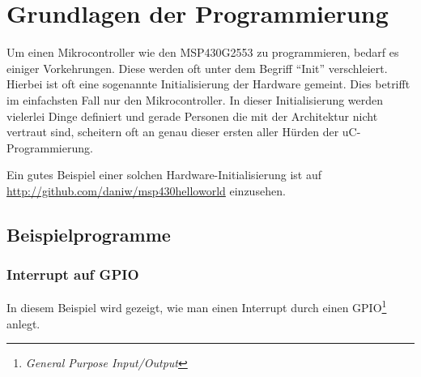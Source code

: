 \section{Grundlagen der Programmierung}
Um einen Mikrocontroller wie den MSP430G2553 zu programmieren, bedarf es
einiger Vorkehrungen. Diese werden oft unter dem Begriff ``Init'' 
verschleiert. Hierbei ist oft eine sogenannte Initialisierung der 
Hardware gemeint. Dies betrifft im einfachsten Fall nur den Mikrocontroller.
In dieser Initialisierung werden vielerlei Dinge definiert und gerade Personen
die mit der Architektur nicht vertraut sind, scheitern oft an genau dieser
ersten aller Hürden der uC-Programmierung.

Ein gutes Beispiel einer solchen Hardware-Initialisierung ist 
auf \url{http://github.com/daniw/msp430helloworld} einzusehen.

\begin{comment}
	Im folgenden wird eine solche Initialisierung vorgestellt samt C- 
	und Header-File.

	\subsection{Hardwareinitialisierung}
	
	
\end{comment}

\subsection{Beispielprogramme}

\subsubsection{Interrupt auf GPIO}
In diesem Beispiel wird gezeigt, wie man einen Interrupt durch einen
GPIO\footnote{\emph{General Purpose Input/Output}} anlegt.


